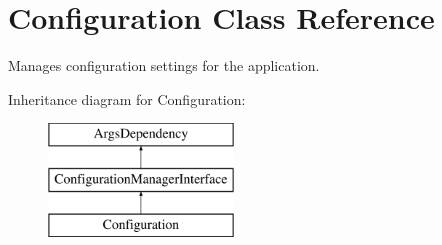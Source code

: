 \hypertarget{classConfiguration}{\section{Configuration Class Reference}
\label{classConfiguration}
}


Manages configuration settings for the application.  


Inheritance diagram for Configuration\-:\begin{figure}[H]
\begin{center}
\leavevmode
\includegraphics[height=3.000000cm]{classConfiguration}
\end{center}
\end{figure}
